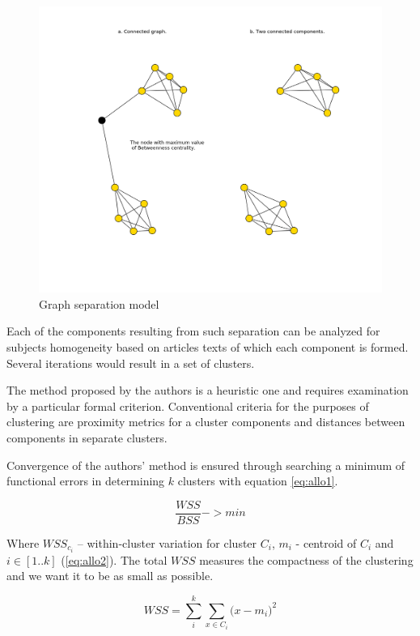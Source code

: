 \documentclass[12pt]{report}
\theoremstyle{definition}
\begin{document}
\begin{figure}[ht]
	\centering
	\includegraphics[width=\textwidth]{allo2eng.png}
	\caption{Graph separation model}
	\label{fig:allo2}
\end{figure}

Each of the components resulting from such separation can be analyzed for subjects homogeneity based on articles texts of which each component is formed. Several iterations would result in a set of clusters. 

The method proposed by the authors is a heuristic one and requires examination by a particular formal criterion. Conventional criteria for the purposes of clustering are proximity metrics for a cluster components and distances between components in separate clusters. 

Convergence of the authors’ method is ensured through searching a minimum of functional errors in determining $\mathit{k}$ clusters with  equation \ref{eq:allo1}.

\begin{equation} 
\frac{WSS}{BSS} -> min
\label{eq:allo1}
\end{equation}

Where $\mathit{WSS_{c_i}}$ –  within-cluster variation for cluster $C_i$, $m_i$ - centroid of $C_i$ and $i \in [1..k]$ (\ref{eq:allo2}).
The total $\mathit{WSS}$ measures the compactness of the clustering and we want it to be as small as possible.

\begin{equation} 
WSS = \displaystyle\sum_i^k\sum_{x \in C_i}\big(x - m_i\big)^2
\label{eq:allo2}
\end{equation}
\end{document}
